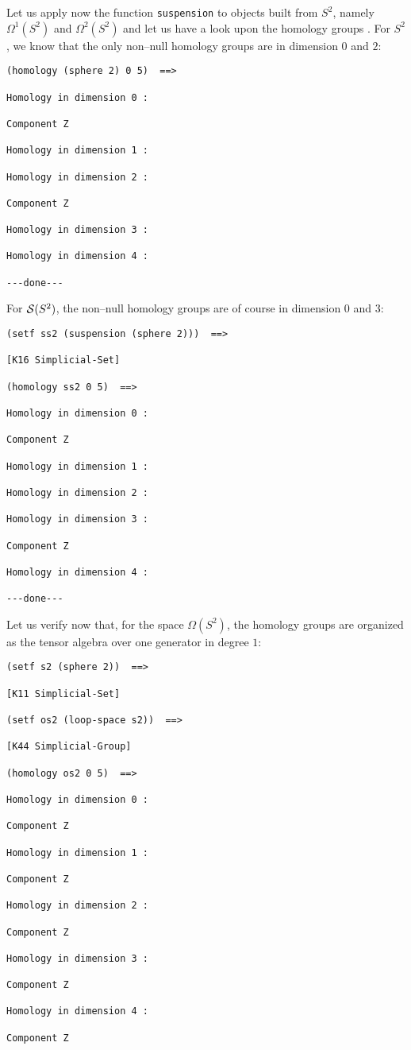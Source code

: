 Let us   apply  now the function {\tt suspension}  to
objects built from $S^2$, namely $\Omega^1(S^2)$ and $\Omega^2(S^2)$ and let us have a look
upon the homology groups . For $S^2$, we know that the only
non--null homology groups are in dimension $0$ and $2$:
{\footnotesize\begin{verbatim}
(homology (sphere 2) 0 5)  ==>

Homology in dimension 0 :

Component Z

Homology in dimension 1 :

Homology in dimension 2 :

Component Z

Homology in dimension 3 :

Homology in dimension 4 :

---done---
\end{verbatim}}
For ${\cal S}(S^2)$, the non--null homology groups are of course in dimension $0$ and $3$:
{\footnotesize\begin{verbatim}
(setf ss2 (suspension (sphere 2)))  ==>

[K16 Simplicial-Set]

(homology ss2 0 5)  ==>

Homology in dimension 0 :

Component Z

Homology in dimension 1 :

Homology in dimension 2 :

Homology in dimension 3 :

Component Z

Homology in dimension 4 :

---done---
\end{verbatim}}
Let us verify now that, for the space $\Omega(S^2)$, the homology groups are organized as
the tensor algebra over one generator in degree $1$:
{\footnotesize\begin{verbatim}
(setf s2 (sphere 2))  ==>

[K11 Simplicial-Set]

(setf os2 (loop-space s2))  ==>

[K44 Simplicial-Group]

(homology os2 0 5)  ==>

Homology in dimension 0 :

Component Z

Homology in dimension 1 :

Component Z

Homology in dimension 2 :

Component Z

Homology in dimension 3 :

Component Z

Homology in dimension 4 :

Component Z

\end{verbatim}}
